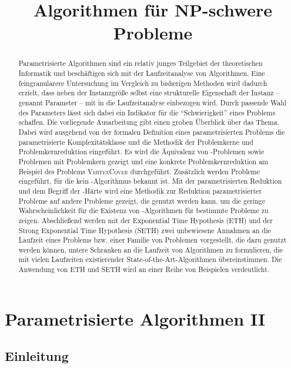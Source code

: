 \documentclass[a4paper,ngerman]{atseminar}
\title{Algorithmen für NP-schwere Probleme}
\author{}
\begin{document}
\maketitle

\GERMAN

\section{Parametrisierte Algorithmen II}

\begin{abstract}
Parametrisierte Algorithmen sind ein relativ junges Teilgebiet der theoretischen Informatik und beschäftigen sich mit der
Laufzeitanalyse von Algorithmen. Eine feingranularere Untersuchung im Vergleich zu bisherigen Methoden wird dadurch erzielt,
dass neben der Instanzgröße selbst eine strukturelle Eigenschaft der Instanz -- genannt Parameter -- mit in die Laufzeitanalyse einbezogen wird.
Durch passende Wahl des Parameters lässt sich dabei ein Indikator für die \enquote{Schwierigkeit} eines Problems schaffen.
Die vorliegende Ausarbeitung gibt einen groben Überblick über das Thema.
Dabei wird ausgehend von der formalen Definition eines parametrisierten Problems die parametrisierte Komplexitätsklasse \FPT\xspace und
die Methodik der Problemkerne und Problemkernreduktion eingeführt. Es wird die Äquivalenz von \FPT-Problemen sowie Problemen mit Problemkern gezeigt und
eine konkrete Problemkernreduktion am Beispiel des Problems \textsc{VertexCover} durchgeführt.
Zusätzlich werden Probleme eingeführt, für die kein \FPT-Algorithmus bekannt ist. Mit der parametrisierten Reduktion
und dem Begriff der \W{[1]}-Härte wird eine Methodik zur Reduktion parametrisierter Probleme auf andere Probleme gezeigt, die genutzt werden kann, um die geringe Wahrscheinlichkeit für die Existenz von \FPT-Algorithmen für
bestimmte Probleme zu zeigen.
Abschließend werden mit der Exponential Time Hypothesis (ETH) und der Strong Exponential Time Hypothesis (SETH) zwei unbewiesene
Annahmen an die Laufzeit eines Problems bzw. einer Familie von Problemen vorgestellt, die dazu genutzt werden können,
untere Schranken an die Laufzeit von Algorithmen zu formulieren, die mit vielen Laufzeiten existierender State-of-the-Art-Algorithmen
übereinstimmen. Die Anwendung von ETH und SETH wird an einer Reihe von Beispielen verdeutlicht.
\end{abstract}

\subsection{Einleitung}
\end{document}
